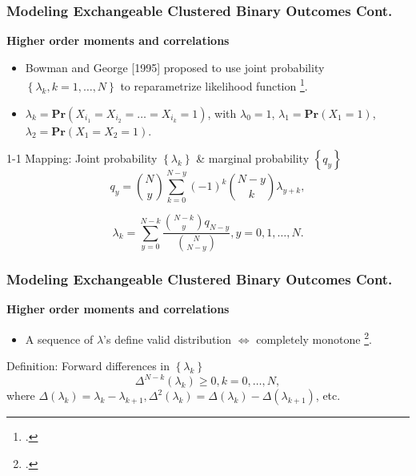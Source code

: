 \documentclass[hyperref={bookmarks=false},aspectratio=169]{beamer}
\begin{document}
\begin{frame}
\frametitle{Modeling Exchangeable Clustered Binary Outcomes Cont.}

\textbf{Higher order moments and correlations}

\begin{itemize}
    \item Bowman and George [1995] proposed to use joint probability $\left\lbrace \lambda_k, k = 1, \dots, N \right\rbrace$ to reparametrize likelihood function \footcite{bowman1995saturated}.
    \item $\lambda_k = \textbf{Pr}(X_{i_1} = X_{i_2} = \dots = X_{i_k} = 1)$, with $\lambda_0=1$, $\lambda_1 = \textbf{Pr} (X_1 = 1)$, $\lambda_2 = \textbf{Pr} (X_1 = X_2 = 1)$.
\end{itemize}

\begin{block}{1-1 Mapping: Joint probability $\left\lbrace \lambda_k \right\rbrace$ {\&} marginal probability $\left\lbrace q_y \right\rbrace$}
\begin{equation*}\label{E:1to1}
q_y = \binom{N}{y} \sum_{k=0}^{N-y} {(-1)^k} \binom{N-y}{k} \lambda_{y+k} ,
\end{equation*}

\begin{equation*}\label{E:also1to1}
\lambda_k = \sum_{y=0}^{N-k} \frac{\binom{N-k}{y} {q_{N-y}}}{\binom{N}{N-y}} , y = 0, 1, \dots, N.
\end{equation*}
\end{block}

\end{frame}

\begin{frame}
\frametitle{Modeling Exchangeable Clustered Binary Outcomes Cont.}

\textbf{Higher order moments and correlations}

\begin{itemize}
    \item A sequence of $\lambda$'s define valid distribution $\Longleftrightarrow$ completely monotone \footcite{bowman1995saturated}.
\end{itemize}

\begin{block}{Definition: Forward differences in $\left\lbrace \lambda_k \right\rbrace$}
\begin{equation*}\label{D:CM}
\Delta^{N-k} (\lambda_k) \geq 0, k = 0, \dots, N,
\end{equation*}
where ${\Delta}(\lambda_k) = \lambda_k - \lambda_{k+1}, {\Delta^2}(\lambda_k) = {\Delta}(\lambda_k) - {\Delta}(\lambda_{k+1})$, etc.
\end{block}

\end{frame}
\end{document}

